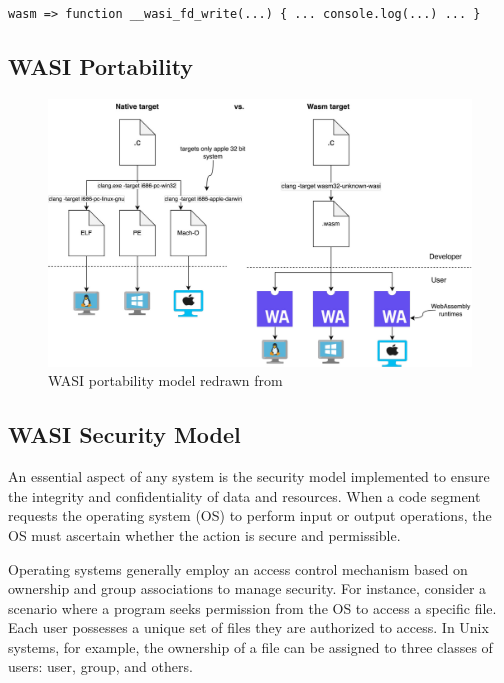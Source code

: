 \verb|wasm => function __wasi_fd_write(...) { ... console.log(...) ... }|



\subsection{WASI Portability}

\begin{figure}[H]
    \centering
        \includegraphics[width=1\linewidth]{images/wasm/WASI_PORTABILITY.pdf}
    \caption{WASI portability model redrawn from \cite{clark_2019_standardising}}
    \label{fig:wasi-portability}
\end{figure}


\subsection{WASI Security Model}
An essential aspect of any system is the security model implemented to ensure the integrity and confidentiality of data and resources. When a code segment requests the operating system (OS) to perform input or output operations, the OS must ascertain whether the action is secure and permissible.

Operating systems generally employ an access control mechanism based on ownership and group associations to manage security. For instance, consider a scenario where a program seeks permission from the OS to access a specific file. Each user possesses a unique set of files they are authorized to access. In Unix systems, for example, the ownership of a file can be assigned to three classes of users: user, group, and others.

